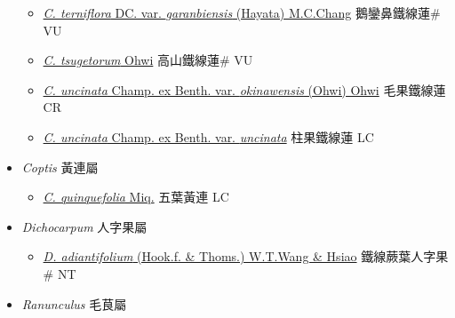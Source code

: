\begin{itemize}
\begin{itemize}
        \item[] \href{http://www.theplantlist.org/tpl1.1/search?q=Clematis+terniflora+var.+garanbiensis}{\textit{C. terniflora} DC. var. \textit{garanbiensis} (Hayata) M.C.Chang}   鵝鑾鼻鐵線蓮\# VU
        \item[] \href{http://www.theplantlist.org/tpl1.1/search?q=Clematis+tsugetorum}{\textit{C. tsugetorum} Ohwi}   高山鐵線蓮\# VU
        \item[] \href{http://www.theplantlist.org/tpl1.1/search?q=Clematis+uncinata+var.+okinawensis}{\textit{C. uncinata} Champ. ex Benth. var. \textit{okinawensis} (Ohwi) Ohwi}   毛果鐵線蓮 CR
        \item[] \href{http://www.theplantlist.org/tpl1.1/search?q=Clematis+uncinata+var.+uncinata}{\textit{C. uncinata} Champ. ex Benth. var. \textit{uncinata}}   柱果鐵線蓮 LC
  \end{itemize}
 \item[] \textit{Coptis} 黃連屬
                    
  \begin{itemize}
        \item[] \href{http://www.theplantlist.org/tpl1.1/search?q=Coptis+quinquefolia}{\textit{C. quinquefolia} Miq.}   五葉黃連 LC
  \end{itemize}
 \item[] \textit{Dichocarpum} 人字果屬
                    
  \begin{itemize}
        \item[] \href{http://www.theplantlist.org/tpl1.1/search?q=Dichocarpum+adiantifolium}{\textit{D. adiantifolium} (Hook.f. \& Thoms.) W.T.Wang \& Hsiao}   鐵線蕨葉人字果\# NT
  \end{itemize}
 \item[] \textit{Ranunculus} 毛茛屬
                    

\end{itemize}
